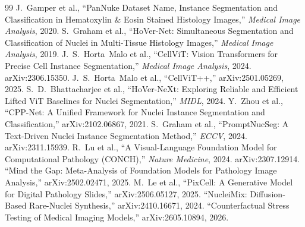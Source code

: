 \documentclass[11pt]{article}
\begin{document}
\begin{thebibliography}{99}\small
{} J.~Gamper et al., ``PanNuke Dataset Name, Instance Segmentation and
Classification in Hematoxylin \& Eosin Stained Histology Images,'' \emph{Medical Image Analysis},
2020.
 S.~Graham et al., ``HoVer-Net: Simultaneous Segmentation and
Classification of Nuclei in Multi-Tissue Histology Images,'' \emph{Medical Image Analysis}, 2019.
 J.~S.~Horta~Malo et al., ``CellViT: Vision Transformers for Precise
Cell Instance Segmentation,'' \emph{Medical Image Analysis}, 2024. arXiv:2306.15350.
 J.~S.~Horta~Malo et al., ``CellViT++,'' arXiv:2501.05269, 2025.
 S.~D.~Bhattacharjee et al., ``HoVer-NeXt: Exploring Reliable and Efficient
Lifted ViT Baselines for Nuclei Segmentation,'' \emph{MIDL}, 2024.
 Y.~Zhou et al., ``CPP-Net: A Unified Framework for Nuclei Instance Segmentation
and Classification,'' arXiv:2102.06867, 2021.
 S.~Graham et al., ``PromptNucSeg: A Text-Driven Nuclei Instance
Segmentation Method,'' \emph{ECCV}, 2024. arXiv:2311.15939.
 R.~Lu et al., ``A Visual-Language Foundation Model for Computational
Pathology (CONCH),'' \emph{Nature Medicine}, 2024. arXiv:2307.12914.
 ``Mind the Gap: Meta-Analysis of Foundation Models for Pathology Image
Analysis,'' arXiv:2502.02471, 2025.
 M.~Le et al., ``PixCell: A Generative Model for Digital Pathology
Slides,'' arXiv:2506.05127, 2025.
 ``NucleiMix: Diffusion-Based Rare-Nuclei Synthesis,'' arXiv:2410.16671, 2024.
 ``Counterfactual Stress Testing of Medical Imaging Models,'' arXiv:2605.10894, 2026.
\end{thebibliography}
\end{document}
